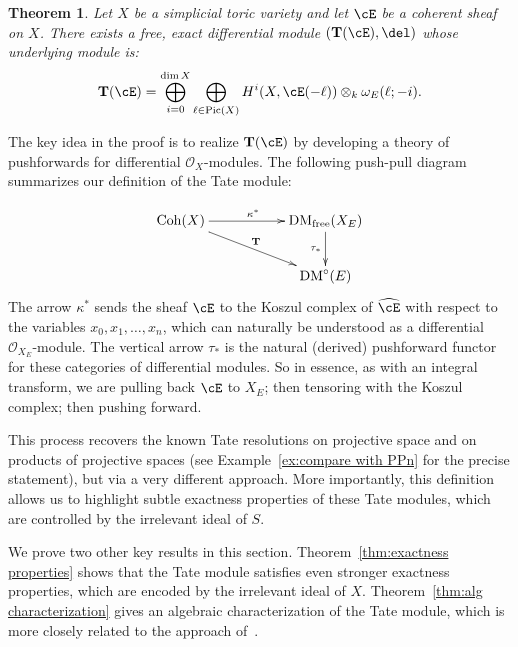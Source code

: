 \documentclass[12pt]{amsart}
\newtheorem{thm}[lemma]{Theorem}
\theoremstyle{definition}
\theoremstyle{remark}
\newcommand{\Tate}{{\mathbf{T}}}
\newcommand{\Pic}{\operatorname{Pic}}
\newcommand{\cO}{{\mathcal O}}
\def\DM{\operatorname{DM}}
\def\Coh{\operatorname{Coh}}
\def\free{\operatorname{free}}
\begin{document}
\begin{thm}\label{thm:toric exact}
Let $X$ be a simplicial toric variety and let $\cE$ be a coherent sheaf on $X$.  There exists a free, exact differential module $(\Tate(\cE), \del)$ whose underlying module is:
\[
\Tate(\cE) = \bigoplus_{i=0}^{\dim X} \bigoplus_{\ell \in \Pic(X)} H^i(X,\cE(-\ell)) \otimes_k \omega_E(\ell;-i).
\]
\end{thm}
The key idea in the proof is to realize $\Tate(\cE)$ by developing a theory of pushforwards for differential $\cO_X$-modules.  The following push-pull diagram summarizes our definition of the Tate module:
%

\[
\xymatrix{
\Coh(X)\ar[rr]^{\kappa^*}\ar[rrd]^-{\mathbf T}&&\DM_{\free}(X_E)\ar[d]_{\tau_*}\\
&&\DM^\circ(E)
}
\]
The arrow $\kappa^*$ sends the sheaf $\cE$ to the Koszul complex of $\widehat{\cE}$ with respect to the variables $x_0, x_1, \dots, x_n$, which can naturally be understood as a differential $\cO_{X_E}$-module.  The vertical arrow $\tau_*$ is the natural (derived) pushforward functor for these categories of differential modules.  So in essence, as with an integral transform, we are pulling back $\cE$ to $X_E$; then  tensoring with the Koszul complex; then pushing forward.  

This process recovers the known Tate resolutions on projective space and on products of projective spaces (see Example~\ref{ex:compare with PPn} for the precise statement), but via a very different approach.  More importantly, this definition allows us to highlight subtle exactness properties of these Tate modules, which are controlled by the irrelevant ideal of $S$.  

We prove two other key results in this section.  Theorem~\ref{thm:exactness properties} shows that the Tate module satisfies even stronger exactness properties, which are encoded by the irrelevant ideal of $X$.  Theorem~\ref{thm:alg characterization} gives an algebraic characterization of the Tate module, which is more closely related to the approach of~\cites{EFS,EES}.
\end{document}
